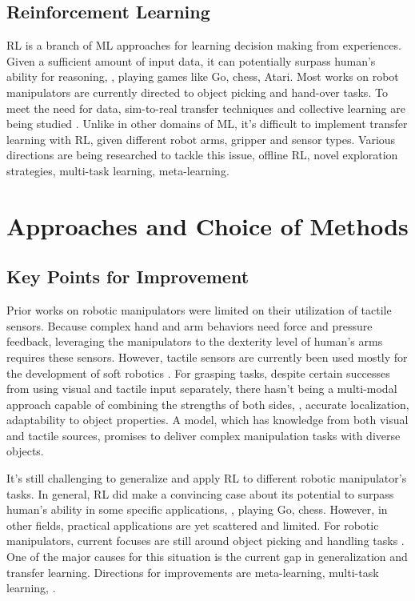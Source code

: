 \subsection{Reinforcement Learning}
\ac{RL} is a branch of \ac{ML} approaches for learning decision making from experiences. Given a sufficient amount of input data, it can potentially surpass human's ability for reasoning, \eg, playing games like Go, chess, Atari. Most works on robot manipulators are currently directed to object picking and hand-over tasks. To meet the need for data, sim-to-real transfer techniques \cite{kleeberger2020survey} and collective learning are being studied \cite{yahya2017collective}. Unlike in other domains of \ac{ML}, it's difficult to implement transfer learning with \ac{RL}, given different robot arms, gripper and sensor types. Various directions are being researched to tackle this issue, \ie offline \ac{RL}, novel exploration strategies, multi-task learning, meta-learning. \cite{kober2013reinforcement, li2017deep, arulkumaran2017deep, singh2021reinforcement}

\section{Approaches and Choice of Methods}
\subsection{Key Points for Improvement}
Prior works on robotic manipulators were limited on their utilization of tactile sensors. Because complex hand and arm behaviors need force and pressure feedback, leveraging the manipulators to the dexterity level of human's arms requires these sensors. However, tactile sensors are currently been used mostly for the development of soft robotics \cite{haddadin2018tactile}. For grasping tasks, despite certain successes from using visual and tactile input separately, there hasn't being a multi-modal approach capable of combining the strengths of both sides, \ie, accurate localization, adaptability to object properties. A model, which has knowledge from both visual and tactile sources, promises to deliver complex manipulation tasks with diverse objects.

It's still challenging to generalize and apply \ac{RL} to different robotic manipulator's tasks. In general, \ac{RL} did make a convincing case about its potential to surpass human's ability in some specific applications, \eg, playing Go, chess. However, in other fields, practical applications are yet scattered and limited. For robotic manipulators, current focuses are still around object picking and handling tasks \cite{singh2021reinforcement}. One of the major causes for this situation is the current gap in generalization and transfer learning. Directions for improvements are meta-learning, multi-task learning, \etc \cite{kober2013reinforcement}.

